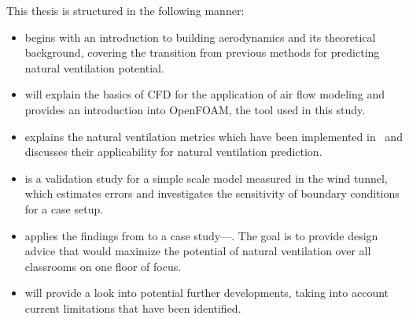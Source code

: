 This thesis is structured in the following manner:

\begin{itemize}
	\item  \textit{} begins with an introduction to building aerodynamics and its theoretical background, covering the transition from previous methods for predicting natural ventilation potential.
	
	\item \textit{} will explain the basics of \gls{CFD} for the application of air flow modeling and provides an introduction into OpenFOAM, the tool used in this study.
	
	\item \textit{} explains the natural ventilation metrics which have been implemented in \OF\ and discusses their applicability for natural ventilation prediction.
	
	\item \textit{} is a validation  study for a simple scale model measured in the wind tunnel, which estimates errors and investigates the sensitivity of boundary conditions for a case setup.
	
	\item \textit{} applies the findings from  to a case study---\BRAC. The goal is to provide design advice that would maximize the potential of natural ventilation over all classrooms on one floor of focus.
	
	\item \textit{} will provide a look into potential further developments, taking into account current limitations that have been identified.
\end{itemize}

